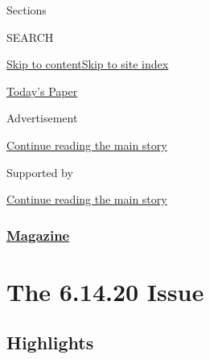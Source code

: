 Sections

SEARCH

\protect\hyperlink{site-content}{Skip to
content}\protect\hyperlink{site-index}{Skip to site index}

\href{https://myaccount.nytimes3xbfgragh.onion/auth/login?response_type=cookie\&client_id=vi}{}

\href{https://www.nytimes3xbfgragh.onion/section/todayspaper}{Today's
Paper}

Advertisement

\protect\hyperlink{after-top}{Continue reading the main story}

Supported by

\protect\hyperlink{after-sponsor}{Continue reading the main story}

\hypertarget{magazine}{%
\subsubsection{\texorpdfstring{\href{/section/magazine}{Magazine}}{Magazine}}\label{magazine}}

\hypertarget{the-61420-issue}{%
\section{The 6.14.20 Issue}\label{the-61420-issue}}

\hypertarget{highlights}{%
\subsection{Highlights}\label{highlights}}

